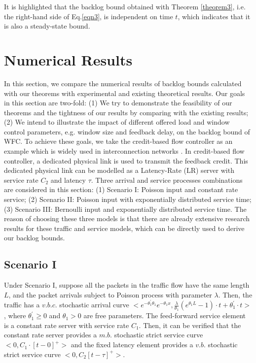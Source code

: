 \documentclass[12pt]{article}
\begin{document}
It is highlighted that the backlog bound obtained with Theorem \ref{theorem3}, i.e. the right-hand side of Eq.\ref{eqn3}, is
independent on time $t$, which indicates that it is also a steady-state bound.

\section{Numerical Results}\label{experiments}
In this section, we compare the numerical results of backlog bounds calculated with our theorems with experimental and existing theoretical results. Our goals in this section are two-fold: (1) We try to demonstrate the feasibility of our theorems and the tightness of our results by comparing with the existing results; (2) We intend to illustrate the impact of different offered load and window control parameters, e.g. window size and feedback delay, on the backlog bound of WFC. To achieve these goals, we take the credit-based flow controller as an example which is widely used in interconnection networks \cite{DaTo04}. In credit-based flow controller, a dedicated physical link is used to transmit the feedback credit. This dedicated physical link can be modelled as a Latency-Rate (LR) server \cite{StVa98} with service rate $C_2$ and latency $\tau$. Three arrival and service processes combinations are considered in this section: (1) Scenario I: Poisson input and constant rate service; (2) Scenario II: Poisson input with exponentially distributed service time; (3) Scenario III: Bernoulli input and exponentially distributed service time. The reason of choosing these three models is that there are already extensive research results for these traffic and service models, which can be directly used to derive our backlog bounds.

\subsection{Scenario I}
Under Scenario I, suppose all the packets in the traffic flow have the same length $L$, and the packet arrivals subject to Poisson process with parameter $\lambda$. Then, the traffic has a $v.b.c.$ stochastic arrival curve $<e^{-\theta_1^\prime\theta_1}e^{-\theta_1 x},\frac{\lambda}{\theta_1}(e^{\theta_1 L}-1)\cdot t+\theta_1^\prime\cdot t>$ \cite{jiang2010note}, where $\theta_1^\prime\geq 0$ and $\theta_1>0$ are free parameters. The feed-forward service element is a constant rate server with service rate $C_1$. Then, it can be verified that the constant rate server provides a $m.b.$ stochastic strict service curve $<0,C_1\cdot [t-0]^+>$ and the fixed latency element provides a $v.b.$ stochastic strict service curve $<0,C_2[t-\tau]^+>$.
\end{document}
